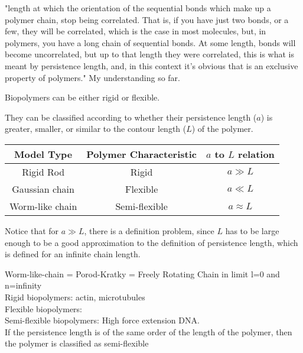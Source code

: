 "length at which the orientation of the sequential bonds which make
up a polymer chain, stop being correlated. That is, if you have just
two bonds, or a few, they will be correlated, which is the case in most
molecules, but, in polymers, you have a long chain of sequential
bonds. At some length, bonds will become uncorrelated, but up to that
length they were correlated, this is what is meant by persistence
length, and, in this context it's obvious that is an exclusive
property of polymers." My understanding so far.


Biopolymers can be either rigid or flexible. 

They can be classified  according to whether their persistence length ($a$)
is greater, smaller, or similar to the contour length ($L$) of the polymer.

\begin{table}[htbp]
\begin{center}  
\begin{tabular}{c|c|c}
\hline
Model Type      & Polymer Characteristic & $a$ to $L$ relation\\ \hline
Rigid Rod       & Rigid          &        $a \gg L$   \\
Gaussian chain  & Flexible       &        $a \ll L$   \\
Worm-like chain & Semi-flexible  &    $a \approx L$ \\
\hline
\end{tabular}
\end{center}
\end{table}
Notice that for $a \gg L$, there is a definition problem, since $L$
has to be large enough to be a good approximation to the definition of
persistence length, which is defined for an infinite chain length.





Worm-like-chain = Porod-Kratky = Freely Rotating Chain in limit l=0
and n=infinity
\\

Rigid biopolymers:
actin, microtubules
\\

Flexible biopolymers:
\\

Semi-flexible biopolymers:
High force extension DNA.
\\

If the persistence length is of the same order of the length of the
polymer, then the polymer is classified as  semi-flexible


